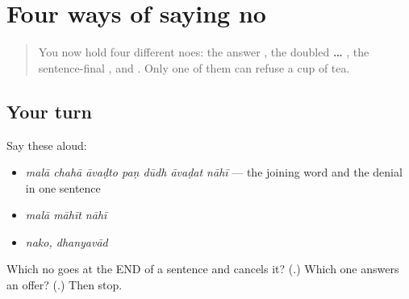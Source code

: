 \section[\texorpdfstring{\mr{नाही} · \mr{नको} (nāhī · nako)}{नाही · नको (nāhī · nako)}]{Four ways of saying no}

\label{lesson:MR-R32-not-so}



\begin{quote}
You now hold four different noes: the answer \textbf{}, the doubled \textbf{ … }, the sentence-final \textbf{}, and \textbf{}. Only one of them can refuse a cup of tea.
\end{quote}

\subsection*{Your turn}
Say these aloud:

\begin{itemize}
\raggedright
  \item \emph{malā chahā āvaḍto paṇ dūdh āvaḍat nāhī} — the joining word and the denial in one sentence
  \item \emph{malā māhīt nāhī}
  \item \emph{nako, dhanyavād}
\end{itemize}

\begin{tcolorbox}[breakable,colback=teal!4,colframe=teal!35!black,title={Before you move on}]
Which no goes at the END of a sentence and cancels it? (\textbf{}.) Which one answers an offer? (\textbf{}.) Then stop.
\end{tcolorbox}
